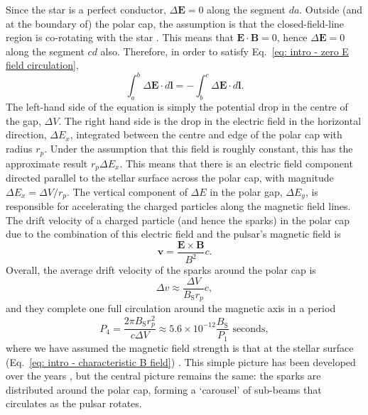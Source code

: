 Since the star is a perfect conductor, $\Delta \mathbf{E} = 0$ along the segment $da$.  Outside (and at the boundary of) the polar cap, the assumption is that the closed-field-line region is co-rotating with the star \citep{GJxx1969}. This means that $\mathbf{E}\cdot\mathbf{B} = 0$, hence $\Delta \mathbf{E} = 0$ along the segment $cd$ also. Therefore, in order to satisfy Eq.~\eqref{eq: intro - zero E field circulation},
\begin{equation}
    \label{eq: intro - balanced E fields}
    \int^b_a \Delta\mathbf{E}\cdot d \mathbf{l} = -\int^c_b \Delta\mathbf{E}\cdot d \mathbf{l}.
\end{equation}
The left-hand side of the equation is simply the potential drop in the centre of the gap, $\Delta V$. The right hand side is the drop in the electric field in the horizontal direction, $\Delta E_x$, integrated between the centre and edge of the polar cap with radius $r_p$. Under the assumption that this field is roughly constant, this has the approximate result $r_p \Delta E_x$. This means that there is an electric field component directed parallel to the stellar surface across the polar cap, with magnitude $\Delta E_x = \Delta V / r_p$. The vertical component of $\Delta E$ in the polar gap, $\Delta E_y$, is responsible for accelerating the charged particles along the magnetic field lines. The drift velocity \citep[e.g.][]{Cxxx2016} of a charged particle (and hence the sparks) in the polar cap due to the combination of this electric field and the pulsar's magnetic field is
\begin{equation}
    \label{eq: intro - E cross B drift}
    \mathbf{v} = \frac{\mathbf{E} \times \mathbf{B}}{B^2}c.
\end{equation}
Overall, the average drift velocity of the sparks around the polar cap is
\begin{equation}
    \label{eq: intro - spark speed}
    \Delta v \approx \frac{\Delta V} {B_\mathrm{S} r_p}c,
\end{equation}
and they complete one full circulation around the magnetic axis in a period
\begin{equation}
    \label{eq: intro - P4 from RS model}
    P_4 = \frac{2\pi B_\mathrm{S} r_p^2}{c\Delta V} \approx 5.6\times10^{-12}\frac{B_\mathrm{S}}{P_1}\text{\ seconds},
\end{equation}
where we have assumed the magnetic field strength is that at the stellar surface (Eq.~\eqref{eq: intro - characteristic B field}) \citep{RSxx1975}. This simple picture has been developed over the years \citep[e.g.][]{GSxx2000, Kxxx2009, Sxxx2013}, but the central picture remains the same: the sparks are distributed around the polar cap, forming a `carousel' of sub-beams that circulates as the pulsar rotates.

